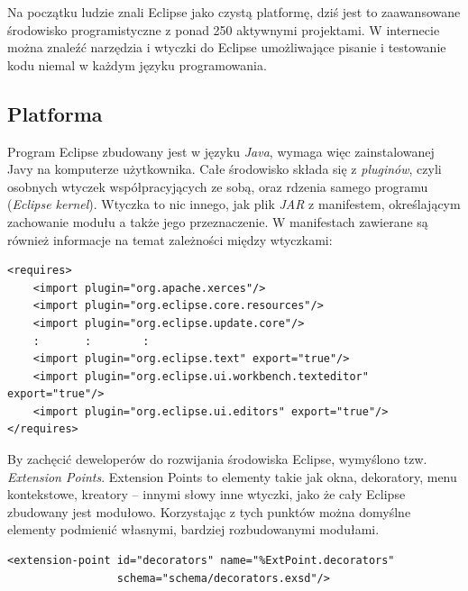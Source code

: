Na początku ludzie znali Eclipse jako czystą platformę, dziś jest to zaawansowane środowisko programistyczne z ponad 250 aktywnymi projektami. W internecie można znaleźć narzędzia i wtyczki do Eclipse umożliwające pisanie i testowanie kodu niemal w każdym języku programowania.

\subsection{Platforma}

Program Eclipse zbudowany jest w języku \emph{Java}, wymaga więc zainstalowanej Javy na komputerze użytkownika.  Całe środowisko składa się z \emph{pluginów}, czyli osobnych wtyczek współpracyjących ze sobą, oraz rdzenia samego programu (\emph{Eclipse kernel}). Wtyczka to nic innego, jak plik \emph{JAR} z manifestem, określającym zachowanie modułu a także jego przeznaczenie. W manifestach zawierane są również informacje na temat zależności między wtyczkami:

\begin{verbatim}
<requires>
	<import plugin="org.apache.xerces"/>
	<import plugin="org.eclipse.core.resources"/>
	<import plugin="org.eclipse.update.core"/>
	:       :        :
	<import plugin="org.eclipse.text" export="true"/>
	<import plugin="org.eclipse.ui.workbench.texteditor" export="true"/>
	<import plugin="org.eclipse.ui.editors" export="true"/>
</requires>
\end{verbatim}

By zachęcić deweloperów do rozwijania środowiska Eclipse, wymyślono tzw. \emph{Extension Points}. Extension Points to elementy takie jak okna, dekoratory, menu kontekstowe, kreatory – innymi słowy inne wtyczki, jako że cały Eclipse zbudowany jest modułowo. Korzystając z tych punktów można domyślne elementy podmienić własnymi, bardziej rozbudowanymi modułami.

\begin{verbatim}
<extension-point id="decorators" name="%ExtPoint.decorators"
                 schema="schema/decorators.exsd"/>
\end{verbatim}

